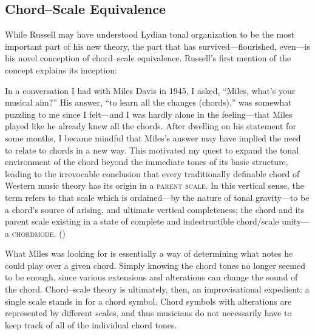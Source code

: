 \subsection{Chord--Scale Equivalence}
\label{subsec:chord-scales}

While Russell may have understood Lydian tonal organization to be the most
important part of his new theory, the part that has survived---flourished,
even---is his novel conception of chord--scale equivalence.
Russell's first mention of the concept explains its inception:%
%
\begin{quoting}
  \singlespacing
  In a conversation I had with Miles Davis in 1945, I asked, ``Miles, what's
  your musical aim?'' His answer, ``to learn all the changes (chords),'' was
  somewhat puzzling to me since I felt---and I was hardly alone in the
  feeling---that Miles played like he already knew all the chords. After
  dwelling on his statement for some months, I became mindful that Miles's
  answer may have implied the need to relate to chords in a new way. This
  motivated my quest to expand the tonal environment of the chord beyond the
  immediate tones of its basic structure, leading to the irrevocable conclusion
  that every traditionally definable chord of Western music theory has its
  origin in a \textsc{parent scale}. In this vertical sense, the term refers to
  that scale which is ordained---by the nature of tonal gravity---to be a
  chord's source of arising, and ultimate vertical completeness; the chord and
  its parent scale existing in a state of complete and indestructible
  chord/scale unity---a \textsc{chordmode}. ()
\end{quoting}

What Miles was looking for is essentially a way of determining
what notes he could play over a given chord. Simply knowing the chord tones
no longer seemed to be enough, since various extensions and alterations can
change the sound of the chord. Chord--scale theory is ultimately, then, an
improvisational expedient: a single scale stands in for a chord symbol.
Chord symbols with alterations are represented by different scales, and thus
musicians do not necessarily have to keep track of all of the individual chord
tones.

